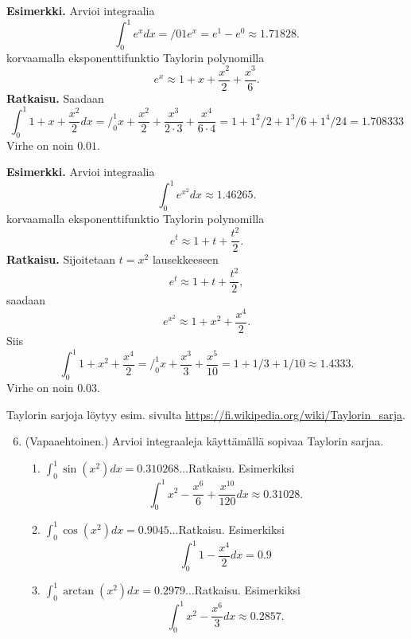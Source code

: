 \documentclass[10pt]{article}
\newcommand{\ratkaisu}[1]{\hfill{\color{blue}\quad\textrm{Ratkaisu. } #1}}
\newcommand{\sij}[0]{\bigg/}
\begin{document}
\textbf{Esimerkki.} Arvioi integraalia
$$
\int_0^{1} e^{x}dx
=\sij{0}{1} e^x=e^1-e^0 \approx 1.71828.
$$
korvaamalla eksponenttifunktio Taylorin polynomilla
$$
e^x\approx 1+x+\frac{x^2}{2}+\frac{x^3}{6}.
$$
\textbf{Ratkaisu.} Saadaan
$$
\int_0^1 1+x+\frac{x^2}{2}dx
=\bigg/_0^1 x+\frac{x^2}{2}+\frac{x^3}{2\cdot 3}+\frac{x^4}{6\cdot 4}
=1+1^2/2+1^3/6+1^4/24
=1.708333
$$
Virhe on noin $0.01$.

\textbf{Esimerkki.} Arvioi integraalia
$$
\int_0^{1} e^{x^2}dx\approx 1.46265.
$$
korvaamalla eksponenttifunktio Taylorin polynomilla
$$
e^t\approx 1+t+\frac{t^2}{2}.
$$
\textbf{Ratkaisu.} Sijoitetaan $t=x^2$ lausekkeeseen
$$
e^t\approx 1+t+\frac{t^2}{2},
$$
saadaan
$$
e^{x^2}\approx 1+x^2+\frac{x^4}{2}.
$$
Siis
$$
\int_0^1 1+x^2+\frac{x^4}{2}
=\bigg /_0^1 x+\frac{x^3}{3}+\frac{x^5}{10}
=1+1/3+1/10\approx 1.4333.
$$
Virhe on noin $0.03$.

Taylorin sarjoja löytyy esim. sivulta \url{https://fi.wikipedia.org/wiki/Taylorin_sarja}.

\begin{enumerate}
\setcounter{enumi}{5}
\item (Vapaaehtoinen.) Arvioi integraaleja käyttämällä sopivaa Taylorin sarjaa.  
\begin{enumerate}
\item $\int_0^1\sin(x^2)dx=0.310268\ldots$\ratkaisu{Esimerkiksi $$\int_0^1 x^2-\frac{x^6}{6}+\frac{x^{10}}{120}dx\approx 0.31028.$$}
\item $\int_0^1\cos(x^2)dx=0.9045\ldots$\ratkaisu{Esimerkiksi $$\int_0^1 1-\frac{x^4}{2}dx=0.9$$}
\item $\int_0^1\arctan(x^2)dx=0.2979\ldots$\ratkaisu{Esimerkiksi $$
\int_0^1 x^2-\frac{x^6}{3}dx\approx 0.2857.
$$}
\end{enumerate}
\end{enumerate}
\end{document}
